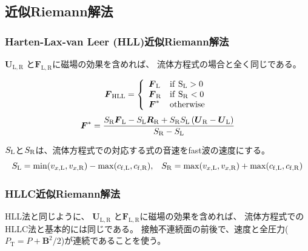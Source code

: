 \subsection{近似Riemann解法}

\subsubsection{Harten-Lax-van Leer (HLL)近似Riemann解法}

$\bm{ U}_\mathrm{L,R}$
と$\bm{ F}_\mathrm{L,R}$に磁場の効果を含めれば、
流体方程式の場合と全く同じである。

\begin{screen}
\begin{equation}
    {\mbox{\boldmath $ F$}}_\mathrm{HLL}
    =\left\{
    \begin{array}{ll}
         {\mbox{\boldmath $ F$}}_\mathrm{L} & \mathrm{if~S_\mathrm{L} > 0} \\
         {\mbox{\boldmath $ F$}}_\mathrm{R} & \mathrm{if~S_\mathrm{R} < 0} \\
         {\mbox{\boldmath $ F$}}^* & \mathrm{otherwise} \\
    \end{array}
    \right.
\end{equation}
\begin{equation}
{\mbox{\boldmath $ F$}}^* = \frac{
S_\mathrm{R} {\mbox{\boldmath $ F$}}_\mathrm{L}
- S_\mathrm{L} {\mbox{\boldmath $ R$}}_\mathrm{R}
+ S_\mathrm{R} S_\mathrm{L} \left({\mbox{\boldmath $ U$}}_\mathrm{R} - {\mbox{\boldmath $ U$}}_\mathrm{L}\right)
}{S_\mathrm{R} - S_\mathrm{L}}
\end{equation}
\end{screen}

\vspace{1cm}

$S_\mathrm{L}$と$S_\mathrm{R}$は、流体方程式での対応する式の音速をfast波の速度にする。
\begin{equation}
   S_\mathrm{L} = \min(v_{x,\mathrm{L}}, v_{x,\mathrm{R}}) -  
    \max(c_\mathrm{f,L}, c_\mathrm{f,R}) ,\;\;\;
   S_\mathrm{R} = \max(v_{x,\mathrm{L}}, v_{x,\mathrm{R}}) +  
    \max(c_\mathrm{f,L}, c_\mathrm{f,R}) 
\end{equation}

\clearpage
\subsubsection{HLLC近似Riemann解法}
HLL法と同じように、
$\bm{ U}_\mathrm{L,R}$
と$\bm{ F}_\mathrm{L,R}$に磁場の効果を含めれば、
流体方程式でのHLLC法と基本的には同じである。
接触不連続面の前後で、速度と全圧力($P_\mathrm{T}=P+\bm{ B}^2/2$)が連続であることを使う。

